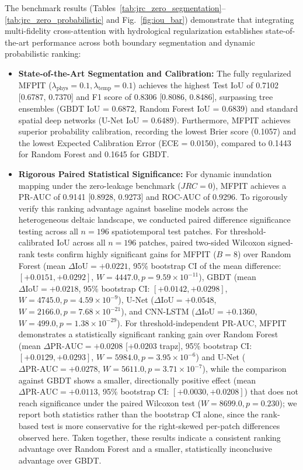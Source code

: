\documentclass[preprint,12pt]{elsarticle}
\begin{document}
The benchmark results (Tables~\ref{tab:jrc_zero_segmentation}--\ref{tab:jrc_zero_probabilistic} and Fig.~\ref{fig:iou_bar}) demonstrate that integrating multi-fidelity cross-attention with hydrological regularization establishes state-of-the-art performance across both boundary segmentation and dynamic probabilistic ranking:
\begin{itemize}
    \item \textbf{State-of-the-Art Segmentation and Calibration:} The fully regularized MFPIT ($\lambda_{\text{phys}} = 0.1, \lambda_{\text{temp}} = 0.1$) achieves the highest Test IoU of 0.7102 [0.6787, 0.7370] and F1 score of 0.8306 [0.8086, 0.8486], surpassing tree ensembles (GBDT IoU = 0.6872, Random Forest IoU = 0.6839) and standard spatial deep networks (U-Net IoU = 0.6489). Furthermore, MFPIT achieves superior probability calibration, recording the lowest Brier score (0.1057) and the lowest Expected Calibration Error (ECE = 0.0150), compared to 0.1443 for Random Forest and 0.1645 for GBDT.
    \item \textbf{Rigorous Paired Statistical Significance:} For dynamic inundation mapping under the zero-leakage benchmark ($JRC=0$), MFPIT achieves a PR-AUC of 0.9141 [0.8928, 0.9273] and ROC-AUC of 0.9296. To rigorously verify this ranking advantage against baseline models across the heterogeneous deltaic landscape, we conducted paired difference significance testing across all $n = 196$ spatiotemporal test patches. For threshold-calibrated IoU across all $n = 196$ patches, paired two-sided Wilcoxon signed-rank tests confirm highly significant gains for MFPIT ($B=8$) over Random Forest (mean $\Delta\text{IoU} = +0.0221$, 95\% bootstrap CI of the mean difference: $[+0.0151, +0.0292]$, $W = 4447.0, p = 9.59 \times 10^{-11}$), GBDT (mean $\Delta\text{IoU} = +0.0218$, 95\% bootstrap CI: $[+0.0142, +0.0298]$, $W = 4745.0, p = 4.59 \times 10^{-9}$), U-Net ($\Delta\text{IoU} = +0.0548$, $W = 2166.0, p = 7.68 \times 10^{-21}$), and CNN-LSTM ($\Delta\text{IoU} = +0.1360$, $W = 499.0, p = 1.38 \times 10^{-29}$). For threshold-independent PR-AUC, MFPIT demonstrates a statistically significant ranking gain over Random Forest (mean $\Delta \text{PR-AUC} = +0.0208$ [$+0.0203$ trapz], 95\% bootstrap CI: $[+0.0129, +0.0293]$, $W = 5984.0, p = 3.95 \times 10^{-6}$) and U-Net ($\Delta\text{PR-AUC} = +0.0278$, $W = 5611.0, p = 3.71 \times 10^{-7}$), while the comparison against GBDT shows a smaller, directionally positive effect (mean $\Delta \text{PR-AUC} = +0.0113$, 95\% bootstrap CI: $[+0.0030, +0.0208]$) that does not reach significance under the paired Wilcoxon test ($W = 8699.0, p = 0.230$); we report both statistics rather than the bootstrap CI alone, since the rank-based test is more conservative for the right-skewed per-patch differences observed here. Taken together, these results indicate a consistent ranking advantage over Random Forest and a smaller, statistically inconclusive advantage over GBDT.

\end{itemize}
\end{document}
